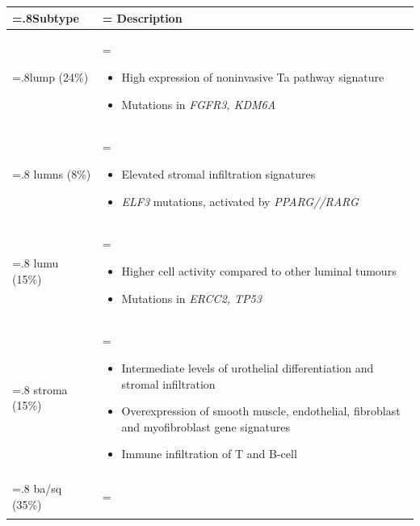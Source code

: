 \begin{table}[!htb]
    \small
    \centering
    \begin{tabularx}{\textwidth}{>{\hsize=.8\hsize}X |>{\hsize=\hsize}X}
    \toprule
    Subtype & Description \\
    \midrule
    \acrlong{lump} (24\%) & 
    \begin{itemize}[leftmargin=*, nosep, after=\vspace{-\baselineskip}]
        \item High expression of noninvasive Ta pathway signature
        \item Mutations in \textit{FGFR3, KDM6A}
    \end{itemize} \\
    \midrule
    \acrlong{lumns} (8\%) & 
    \begin{itemize}[leftmargin=*, nosep, after=\vspace{-\baselineskip}]
        \item Elevated stromal infiltration signatures
        \item \textit{ELF3} mutations, activated by \textit{PPARG//RARG}
    \end{itemize} \\
    \midrule
    \acrlong{lumu} (15\%) & 
    \begin{itemize}[leftmargin=*, nosep, after=\vspace{-\baselineskip}]
        \item Higher cell activity compared to other luminal tumours
        \item Mutations in \textit{ERCC2, TP53}
    \end{itemize} \\
    \midrule
    \acrlong{stroma} (15\%) & 
    \begin{itemize}[leftmargin=*, nosep, after=\vspace{-\baselineskip}]
        \item Intermediate levels of urothelial differentiation and stromal infiltration
        \item Overexpression of smooth muscle, endothelial, fibroblast and myofibroblast gene signatures
        \item Immune infiltration of T and B-cell
    \end{itemize} \\
    \midrule
    \acrlong{ba/sq} (35\%) & 
    \begin{itemize}[leftmargin=*, nosep, after=\vspace{-\baselineskip}]

\end{itemize}
\end{tabularx}
\end{table}

